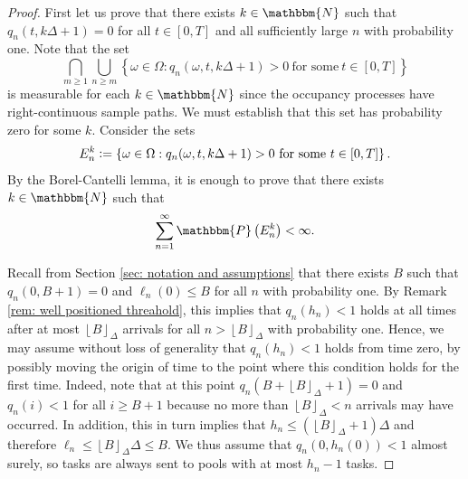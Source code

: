 \documentclass[a4paper, 12pt]{article}
\theoremstyle{definition}
\newcommand{\floor}[1]{\left\lfloor#1\right\rfloor}
\newcommand{\set}[2]{\left\{#1 : #2\right\}}
\newcommand{\defeq}{\vcentcolon=}
\newcommand{\prob}{\mathbbm{P}}
\newcommand{\N}{\mathbbm{N}}
\begin{document}
\begin{proof}
First let us prove that there exists $k \in \N$ such that $q_n(t, k \Delta + 1) = 0$ for all $t \in [0, T]$ and all sufficiently large $n$ with probability one. Note that the set
\begin{equation*}
	\bigcap_{m \geq 1} \bigcup_{n \geq m} \set{\omega \in \Omega}{q_n(\omega, t, k \Delta + 1) > 0\ \text{for some}\ t \in [0, T]}
\end{equation*}
is measurable for each $k \in \N$ since the occupancy processes have right-continuous sample paths. We must establish that this set has probability zero for some $k$. Consider the sets
\begin{equation*}
	E_n^k \defeq \set{\omega \in \Omega}{q_n(\omega, t, k \Delta + 1) > 0\ \text{for some}\ t \in [0, T]}.
\end{equation*}
By the Borel-Cantelli lemma, it is enough to prove that there exists $k \in \N$ such that
\begin{equation}
	\label{eq: borel-cantelli condition}
	\sum_{n = 1}^\infty \prob\left(E_n^k\right) < \infty.
\end{equation}

Recall from Section \ref{sec: notation and assumptions} that there exists $B$ such that $q_n(0, B + 1) = 0$ and $\ell_n(0) \leq B$ for all $n$ with probability one. By Remark \ref{rem: well positioned threahold}, this implies that $q_n(h_n) < 1$ holds at all times after at most $\floor{B}_\Delta$ arrivals for all $n > \floor{B}_\Delta$ with probability one. Hence, we may assume without loss of generality that $q_n(h_n) < 1$ holds from time zero, by possibly moving the origin of time to the point where this condition holds for the first time. Indeed, note that at this point $q_n(B + \floor{B}_\Delta + 1) = 0$ and $q_n(i) < 1$ for all $i \geq B + 1$ because no more than $\floor{B}_\Delta < n$ arrivals may have occurred. In addition, this in turn implies that $h_n \leq \left(\floor{B}_\Delta + 1\right) \Delta$ and therefore $\ell_n \leq \floor{B}_\Delta \Delta \leq B$. We thus assume that $q_n(0, h_n(0)) < 1$ almost surely, so tasks are always sent to pools with at most $h_n - 1$ tasks.


\end{proof}
\end{document}
